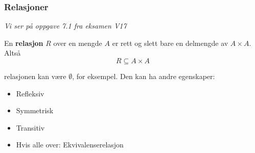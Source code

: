 \documentclass{beamer}
\begin{document}
\begin{frame}
	\frametitle{Relasjoner}
	\textit{Vi ser på oppgave 7.1 fra eksamen V17}
	
	En \textbf{relasjon} $R$ over en mengde $A$ er rett og slett bare en delmengde av $A \times A$. Altså \[R \subseteq A \times A\]
	
	relasjonen kan være $\emptyset$, for eksempel. Den kan ha andre egenskaper:
	
	\begin{itemize}
		\item Refleksiv
		\item Symmetrisk
		\item Transitiv
		\item Hvis alle over: Ekvivalenserelasjon
	\end{itemize}
\end{frame}
\end{document}
